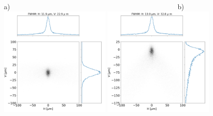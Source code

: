 \documentclass{iucr}              %
\begin{document}
\begin{figure}\label{fig:finalcomparison}
\flushleft
a)~~~~~~~~~~~~~~~~~~~~~~~~~~~~~~~~~~~~~~~~~~~~~~~~~b)\\
\centering
\includegraphics[width=0.49\textwidth]{figures/prefinal_approx1.png} 
\includegraphics[width=0.49\textwidth]{figures/prefinal_approx1_linearized.png}\\


\end{figure}
\end{document}
